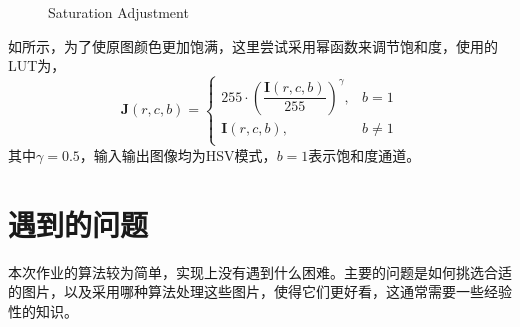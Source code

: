 \documentclass[12pt,a4paper]{article}
\begin{document}
\begin{figure}[H]
    \centering
    \caption{Saturation Adjustment}
    \label{fig:saturation}
\end{figure}

如所示，为了使原图颜色更加饱满，这里尝试采用幂函数来调节饱和度，使用的LUT为，
\begin{equation}
    \boldsymbol{J}(r, c, b) =
    \begin{cases}
        255 \cdot \left(\dfrac{\boldsymbol{I}(r, c, b)}{255}\right)^\gamma, & b=1\\
        \boldsymbol{I}(r, c, b), & b\ne 1\\
    \end{cases}
\end{equation}
其中$\gamma=0.5$，输入输出图像均为HSV模式，$b=1$表示饱和度通道。

\section{遇到的问题}

本次作业的算法较为简单，实现上没有遇到什么困难。主要的问题是如何挑选合适的图片，以及采用哪种算法处理这些图片，使得它们更好看，这通常需要一些经验性的知识。
\end{document}
